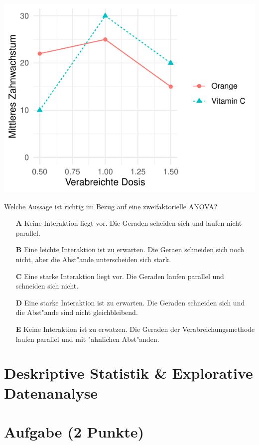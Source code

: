\documentclass[a4paper, 9pt]{scrartcl}\usepackage[]{graphicx}\usepackage[]{xcolor}
\makeatletter
\def\maxwidth{ %
  \ifdim\Gin@nat@width>\linewidth
    \linewidth
  \else
    \Gin@nat@width
  \fi
}
\makeatother
\begin{document}
{\centering \includegraphics[width=\maxwidth]{img/mc-anova-02-a-1} 

}




Welche Aussage ist richtig im Bezug auf eine zweifaktorielle ANOVA?



\begin{enumerate}
\item [\textbf{A} \msquare] Keine Interaktion liegt vor. Die Geraden scheiden sich und laufen nicht parallel.
\item [\textbf{B} \msquare] Eine leichte Interaktion ist zu erwarten. Die Geraen schneiden sich noch nicht, aber die Abst{"a}nde unterscheiden sich stark.
\item [\textbf{C} \msquare] Eine starke Interaktion liegt vor. Die Geraden laufen parallel und schneiden sich nicht.
\item [\textbf{D} \msquare] Eine starke Interaktion ist zu erwarten. Die Geraden schneiden sich und die Abst{"a}nde sind nicht gleichbleibend.
\item [\textbf{E} \msquare] Keine Interaktion ist zu erwatzen. Die Geraden der Verabreichungsmethode laufen parallel und mit {"a}hnlichen Abst{"a}nden.
\end{enumerate} 
\section*{Deskriptive Statistik \& Explorative Datenanalyse}

\section{Aufgabe \hfill (2 Punkte)}
\end{document}
